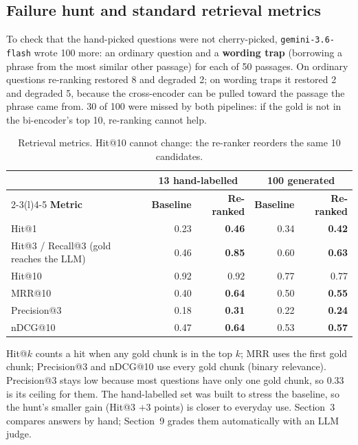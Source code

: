\documentclass[10pt,a4paper]{article}
\begin{document}
\subsection*{Failure hunt and standard retrieval metrics}

To check that the hand-picked questions were not cherry-picked, \texttt{gemini-3.6-flash} wrote 100 more: an
ordinary question and a \textbf{wording trap} (borrowing a phrase from the most similar other passage) for each
of 50 passages. On ordinary questions re-ranking restored 8 and degraded 2; on wording traps it restored 2 and
degraded 5, because the cross-encoder can be pulled toward the passage the phrase came from. 30 of 100 were missed
by both pipelines: if the gold is not in the bi-encoder's top 10, re-ranking cannot help.

\begin{table}[!htbp]
\centering\small
\begin{tabular}{@{}lrrrr@{}}
\toprule
 & \multicolumn{2}{c}{\textbf{13 hand-labelled}} & \multicolumn{2}{c}{\textbf{100 generated}} \\
\cmidrule(lr){2-3}\cmidrule(l){4-5}
\textbf{Metric} & \textbf{Baseline} & \textbf{Re-ranked} & \textbf{Baseline} & \textbf{Re-ranked} \\
\midrule
Hit@1                                   & 0.23 & \textbf{0.46} & 0.34 & \textbf{0.42} \\
Hit@3 / Recall@3 (gold reaches the LLM) & 0.46 & \textbf{0.85} & 0.60 & \textbf{0.63} \\
Hit@10                                  & 0.92 & 0.92 & 0.77 & 0.77 \\
MRR@10                                  & 0.40 & \textbf{0.64} & 0.50 & \textbf{0.55} \\
Precision@3                             & 0.18 & \textbf{0.31} & 0.22 & \textbf{0.24} \\
nDCG@10                                 & 0.47 & \textbf{0.64} & 0.53 & \textbf{0.57} \\
\bottomrule
\end{tabular}
\caption{Retrieval metrics. Hit@10 cannot change: the re-ranker reorders the same 10 candidates.}
\end{table}

Hit@$k$ counts a hit when any gold chunk is in the top $k$; MRR uses the first gold chunk; Precision@3 and nDCG@10
use every gold chunk (binary relevance). Precision@3 stays low because most questions have only one gold chunk,
so 0.33 is its ceiling for them. The hand-labelled set was built to stress the
baseline, so the hunt's smaller gain (Hit@3 $+3$ points) is closer to everyday use. Section~3 compares answers
by hand; Section~9 grades them automatically with an LLM judge.
\end{document}
